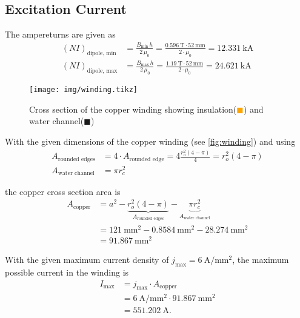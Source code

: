 \documentclass[10pt,a4paper,noendnumber=true]{scrartcl}
\begin{document}
\subsection{Excitation Current}
The ampereturns are given as
\begin{align}
    (NI)_\text{dipole, min} &= \frac{B_\text{min}\,h}{2\,\mu_0} = \frac{\SI{0.596}{\tesla} \cdot \SI{52}{\mm}}{2\cdot \mu_0} = \SI{12.331}{\kilo\ampere}\\
    (NI)_\text{dipole, max} &= \frac{B_\text{max}\,h}{2\,\mu_0} = \frac{\SI{1.19}{\tesla} \cdot \SI{52}{\mm}}{2\cdot \mu_0} = \SI{24.621}{\kilo\ampere}
\end{align}

\begin{figure}[H]
\centering
\texttt{[image: img/winding.tikz]}
\caption{Cross section of the copper winding showing  insulation(\textcolor{orange}{$\blacksquare$}) and water channel(\textcolor{blue!20}{$\blacksquare$})}
\label{fig:winding}
\end{figure}

With the given dimensions of the copper winding (see \autoref{fig:winding}) and using 
\begin{align}
A_\text{rounded edges} &= 4 \cdot  A_\text{rounded edge} = 4 \frac{r_o^2 (4-\pi)}{4} = r_o^2(4-\pi) \\
A_\text{water channel} &= \pi r_c^2
\end{align}

the copper cross section area is
\begin{align}
	A_\text{copper} & = a^2 - \underbrace{r_o^2(4-\pi)}_{A_\text{rounded edges}} - \underbrace{\pi r_c^2}_{A_\text{water channel}} \\
	  & = \SI{121}{\mm\squared} - \SI{0.8584}{\mm\squared} - \SI{28.274}{\mm\squared} \nonumber                      \\
	  & = \SI{91.867}{\mm\squared} \nonumber
\end{align}

With the given maximum current density of $j_\text{max}=\SI{6}{\ampere\per\mm\squared}$, the maximum possible current in the winding is
\begin{align}
I_\text{max} &= j_\text{max} \cdot A_\text{copper} \\
 &=\SI{6}{\ampere\per\mm\squared} \cdot \SI{91.867}{\mm\squared} \nonumber\\ 
 &= \SI{551.202}{\ampere}. \nonumber
\end{align}
\end{document}
